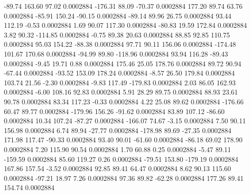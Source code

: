       -89.74      163.60       97.02     0.0002884
     -176.31       88.09      -70.37     0.0002884
      177.20       89.74       63.76     0.0002884
      -85.91      150.24      -90.15     0.0002884
      -89.14       89.96       26.75     0.0002884
       93.44      112.19       -0.53     0.0002884
        1.69       90.07      117.30     0.0002884
      -80.83       19.59      172.84     0.0002884
        3.82       90.32     -114.85     0.0002884
       -0.75       89.38       20.63     0.0002884
       88.85       92.85      110.75     0.0002884
       95.03      154.22      -88.38     0.0002884
       97.71       90.11      156.06     0.0002884
     -174.48      101.67      170.68     0.0002884
      -94.99       89.80     -118.96     0.0002884
       93.94      116.28      -89.43     0.0002884
       -9.45       19.71        0.88     0.0002884
      175.46       25.05      178.76     0.0002884
       89.72       90.94      -67.44     0.0002884
      -93.52      153.09      178.24     0.0002884
       -8.57       26.50      179.84     0.0002884
      103.74       21.56       -2.30     0.0002884
       -9.83      117.49     -179.83     0.0002884
        2.03       86.05      162.93     0.0002884
       -6.00      108.16       92.83     0.0002884
        5.91       28.29       89.75     0.0002884
       88.93       23.61       90.78     0.0002884
       83.34      117.23       -0.33     0.0002884
        4.22       25.08       89.62     0.0002884
     -176.66       60.47       89.77     0.0002884
     -179.96      156.26      -91.62     0.0002884
       83.89      107.12      -86.60     0.0002884
       10.34      107.24      -87.27     0.0002884
     -166.07       74.67       -3.15     0.0002884
        7.50       90.11      156.98     0.0002884
        6.74       89.94      -27.77     0.0002884
     -178.98       89.69      -27.35     0.0002884
      171.98      117.47      -90.33     0.0002884
       93.40       90.01      -61.60     0.0002884
      -86.18       69.02      178.90     0.0002884
        7.20      115.90       90.54     0.0002884
        1.70       60.88        0.25     0.0002884
       -5.47       89.11     -159.59     0.0002884
       85.60      119.27        0.26     0.0002884
      -79.51      153.80     -179.19     0.0002884
      167.86      157.54       -3.52     0.0002884
       92.85       89.41       64.47     0.0002884
        8.62       90.13      115.60     0.0002884
      -97.21       18.97        7.26     0.0002884
       97.36       89.82      -62.28     0.0002884
      177.26       89.41      154.74     0.0002884
